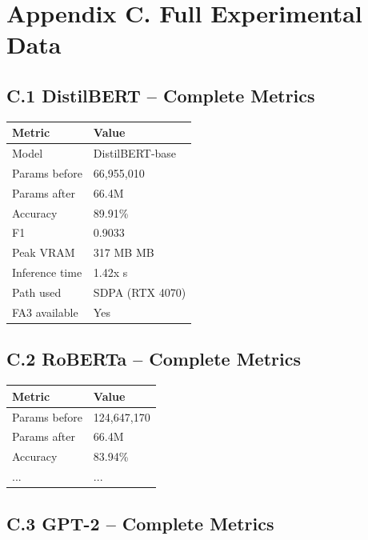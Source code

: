 \section{Appendix C. Full Experimental Data}

\subsection{C.1 DistilBERT -- Complete Metrics}

\begin{table}[H]
\centering
\small
\begin{tabular}{ll}
\toprule
\textbf{Metric} & \textbf{Value} \\
\midrule
Model & DistilBERT-base \\
Params before & 66,955,010 \\
Params after & 66.4M \\
Accuracy & 89.91\% \\
F1 & 0.9033 \\
Peak VRAM & 317 MB MB \\
Inference time & 1.42x s \\
Path used & SDPA (RTX 4070) \\
FA3 available & Yes \\
\bottomrule
\end{tabular}
\end{table}

\subsection{C.2 RoBERTa -- Complete Metrics}

\begin{table}[H]
\centering
\small
\begin{tabular}{ll}
\toprule
\textbf{Metric} & \textbf{Value} \\
\midrule
Params before & 124,647,170 \\
Params after & 66.4M \\
Accuracy & 83.94\% \\
... & ... \\
\bottomrule
\end{tabular}
\end{table}

\subsection{C.3 GPT-2 -- Complete Metrics}

